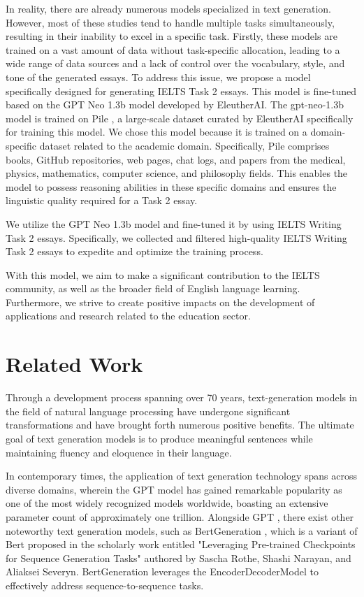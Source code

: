 \documentclass[conference]{IEEEtran}
\begin{document}
In reality, there are already numerous models specialized in text generation. However, most of these studies tend to handle multiple tasks simultaneously, resulting in their inability to excel in a specific task. Firstly, these models are trained on a vast amount of data without task-specific allocation, leading to a wide range of data sources and a lack of control over the vocabulary, style, and tone of the generated essays. To address this issue, we propose a model specifically designed for generating IELTS Task 2 essays. This model is fine-tuned based on the GPT Neo 1.3b model \cite{gpt-neo} developed by EleutherAI. The gpt-neo-1.3b model is trained on Pile \cite{pile-dataset}, a large-scale dataset curated by EleutherAI specifically for training this model. We chose this model because it is trained on a domain-specific dataset related to the academic domain. Specifically, Pile comprises books, GitHub repositories, web pages, chat logs, and papers from the medical, physics, mathematics, computer science, and philosophy fields. This enables the model to possess reasoning abilities in these specific domains and ensures the linguistic quality required for a Task 2 essay.

We utilize the GPT Neo 1.3b model and fine-tuned it by using IELTS Writing Task 2 essays. Specifically, we collected and filtered high-quality IELTS Writing Task 2 essays to expedite and optimize the training process.

With this model, we aim to make a significant contribution to the IELTS community, as well as the broader field of English language learning. Furthermore, we strive to create positive impacts on the development of applications and research related to the education sector.

\section{Related Work}

Through a development process spanning over 70 years, text-generation models in the field of natural language processing have undergone significant transformations and have brought forth numerous positive benefits. The ultimate goal of text generation models is to produce meaningful sentences while maintaining fluency and eloquence in their language.


In contemporary times, the application of text generation technology spans across diverse domains, wherein the GPT model has gained remarkable popularity as one of the most widely recognized models worldwide, boasting an extensive parameter count of approximately one trillion. Alongside GPT \cite{gpt-1}, there exist other noteworthy text generation models, such as BertGeneration \cite{bert}, which is a variant of Bert proposed in the scholarly work entitled "Leveraging Pre-trained Checkpoints for Sequence Generation Tasks" authored by Sascha Rothe, Shashi Narayan, and Aliaksei Severyn. BertGeneration leverages the EncoderDecoderModel \cite{encoder-decoder} to effectively address sequence-to-sequence tasks.
\end{document}
